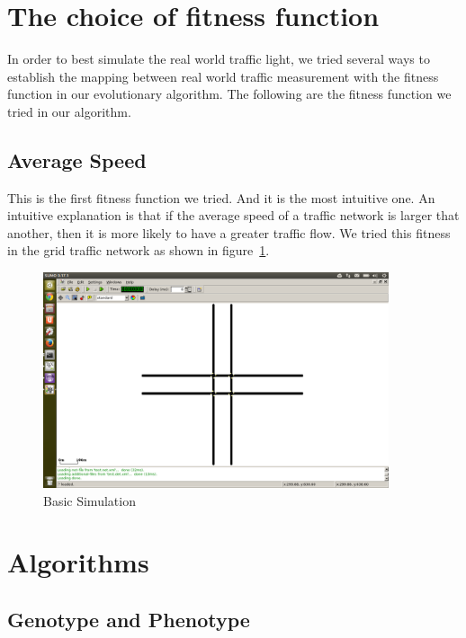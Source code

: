 \documentclass{article} %
\begin{document}
\section{The choice of fitness function}
In order to best simulate the real world traffic light, we tried several ways to establish the mapping between real world traffic measurement with the fitness function in our evolutionary algorithm. The following are the fitness function we tried in our algorithm.
\subsection{Average Speed}
This is the first fitness function we tried. And it is the most intuitive one. An intuitive explanation is that if the average speed of a traffic network is larger that another, then it is more likely to have a greater traffic flow. We tried this fitness in the grid traffic network as shown in figure~\ref{fig:gridoptimum}.

\begin{figure}
\includegraphics[width=4in]{images/simulator/gridoptimum.png}
\caption{Basic Simulation}
\label{fig:gridoptimum}
\end{figure}

\section{Algorithms}
\subsection{Genotype and Phenotype}
\end{document}
